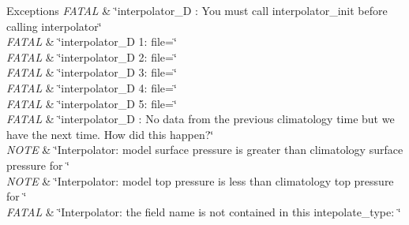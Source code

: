 \begin{DoxyExceptions}{Exceptions}
{\em F\+A\+T\+AL} & \char`\"{}interpolator\+\_\+D \+: You must call interpolator\+\_\+init
                before calling interpolator\char`\"{} \\
\hline
{\em F\+A\+T\+AL} & \char`\"{}interpolator\+\_\+D 1\+:  file=\char`\"{} \\
\hline
{\em F\+A\+T\+AL} & \char`\"{}interpolator\+\_\+D 2\+:  file=\char`\"{} \\
\hline
{\em F\+A\+T\+AL} & \char`\"{}interpolator\+\_\+D 3\+:  file=\char`\"{} \\
\hline
{\em F\+A\+T\+AL} & \char`\"{}interpolator\+\_\+D 4\+:  file=\char`\"{} \\
\hline
{\em F\+A\+T\+AL} & \char`\"{}interpolator\+\_\+D 5\+:  file=\char`\"{} \\
\hline
{\em F\+A\+T\+AL} & \char`\"{}interpolator\+\_\+D \+: No data from the previous climatology
                time but we have the next time. How did this happen?\char`\"{} \\
\hline
{\em N\+O\+TE} & \char`\"{}\+Interpolator\+: model surface pressure is greater than
              climatology surface pressure for \char`\"{} \\
\hline
{\em N\+O\+TE} & \char`\"{}\+Interpolator\+: model top pressure is less than
                climatology top pressure for \char`\"{} \\
\hline
{\em F\+A\+T\+AL} & \char`\"{}\+Interpolator\+: the field name is not contained in this
                intepolate\+\_\+type\+: \char`\"{} \\
\hline
\end{DoxyExceptions}
\mbox{\label{namespaceinterpolator__mod_aeb3700c595f4ad78698cd2905b4de9e0}} 
